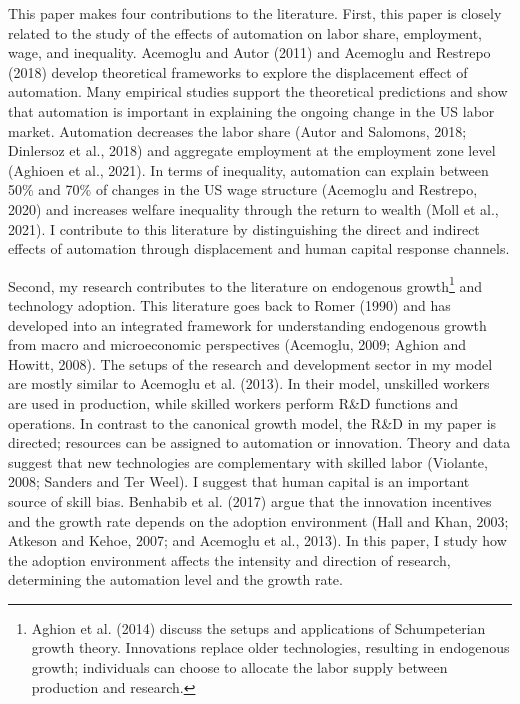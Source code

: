 \documentclass[12pt]{article}
\begin{document}
This paper makes four contributions to the literature. First, this paper is closely related to the study of the effects of automation on labor share, employment, wage, and inequality. Acemoglu and Autor (2011)\nocite{AcemogluAutor2011} and Acemoglu and Restrepo (2018)\nocite{AcemogluRestrepo2018} develop theoretical frameworks to explore the displacement effect of automation. Many empirical studies support the theoretical predictions and show that automation is important in explaining the ongoing change in the US labor market. Automation decreases the labor share (Autor and Salomons, 2018\nocite{AutorSalomons2018}; Dinlersoz et al., 2018\nocite{Dinlersozetal2018}) and aggregate employment at the employment zone level (Aghioen et al., 2021\nocite{Aghioenetal2021}). In terms of inequality, automation can explain between 50\% and 70\% of changes in the US wage structure (Acemoglu and Restrepo, 2020\nocite{AcemogluRestrepo2020}) and increases welfare inequality through the return to wealth (Moll et al., 2021\nocite{Molletal2021}). I contribute to this literature by distinguishing the direct and indirect effects of automation through displacement and human capital response channels. 

Second, my research contributes to the literature on endogenous growth\footnote{Aghion et al. (2014)\nocite{Aghionetal2014} discuss the setups and applications of Schumpeterian growth theory. Innovations replace older technologies, resulting in endogenous growth; individuals can choose to allocate the labor supply between production and research.} and technology adoption. This literature goes back to Romer (1990)\nocite{Romer1990} and has developed into an integrated framework for understanding endogenous growth from macro and microeconomic perspectives (Acemoglu, 2009\nocite{Acemoglu2012}; Aghion and Howitt, 2008\nocite{AghionHowitt2008}). The setups of the research and development sector in my model are mostly similar to Acemoglu et al. (2013)\nocite{Acemogluetal2013}. In their model, unskilled workers are used in production, while skilled workers perform R\&D functions and operations. In contrast to the canonical growth model, the R\&D in my paper is directed; resources can be assigned to automation or innovation. Theory and data suggest that new technologies are complementary with skilled labor (Violante, 2008\nocite{Violante2008}; Sanders and Ter Weel\nocite{SandersTerWeel2000}). I suggest that human capital is an important source of skill bias. Benhabib et al. (2017)\nocite{Benhabibetal2017} argue that the innovation incentives and the growth rate depends on the adoption environment (Hall and Khan, 2003\nocite{HallKhan2003}; Atkeson and Kehoe, 2007\nocite{AtkesonKehoe2007}; and Acemoglu et al., 2013\nocite{Acemogluetal2013}). In this paper, I study how the adoption environment affects the intensity and direction of research, determining the automation level and the growth rate. 
\end{document}
